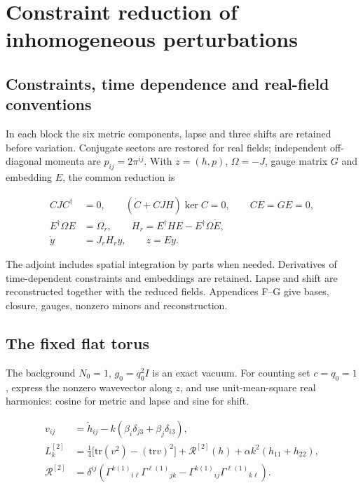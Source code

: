 \section{Constraint reduction of inhomogeneous perturbations}

\subsection{Constraints, time dependence and real-field conventions}

In each block the six metric components, lapse and three shifts are retained before variation. Conjugate sectors are restored for real fields; independent off-diagonal momenta are $p_{ij}=2\pi^{ij}$. With $z=(h,p)$, $\Omega=-J$, gauge matrix $G$ and embedding $E$, the common reduction is

\begin{equation}\tag{R-01}\label{eq:R-01}
\begin{aligned}
CJC^\dagger&=0,\qquad(\dot C+CJH)\ker C=0,\qquad CE=GE=0,\\
E^\dagger\Omega E&=\Omega_r,\qquad H_r=E^\dagger HE-E^\dagger\Omega\dot E,\\
\dot y&=J_rH_ry,\qquad z=Ey.
\end{aligned}
\end{equation}

The adjoint includes spatial integration by parts when needed. Derivatives of time-dependent constraints and embeddings are retained. Lapse and shift are reconstructed together with the reduced fields. Appendices F--G give bases, closure, gauges, nonzero minors and reconstruction.

\subsection{The fixed flat torus}

The background $N_0=1$, $g_0=q_0^2I$ is an exact vacuum. For counting set $c=q_0=1$, express the nonzero wavevector along $z$, and use unit-mean-square real harmonics: cosine for metric and lapse and sine for shift.

\begin{equation}\tag{W-01}\label{eq:W-01}
\begin{aligned}v_{ij}&=\dot h_{ij}-k(\beta_i\delta_{j3}+\beta_j\delta_{i3}),\\ L^{[2]}_k&=\tfrac14\bigl[\mathrm{tr}(v^2)-(\mathrm{tr}v)^2\bigr]+\mathcal R^{[2]}(h)+\alpha k^2(h_{11}+h_{22}),\\ \mathcal R^{[2]}&=\delta^{ij}(\Gamma^{k(1)}{}_{i\ell}\Gamma^{\ell(1)}{}_{jk}-\Gamma^{k(1)}{}_{ij}\Gamma^{\ell(1)}{}_{k\ell}).\end{aligned}
\end{equation}

